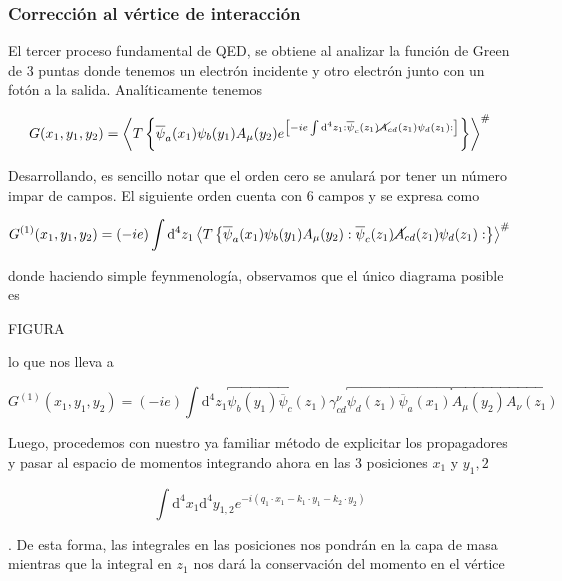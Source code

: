 \documentclass{article}
\numberwithin{equation}{section}
\begin{document}
\subsubsection{Corrección al vértice de interacción}

El tercer proceso fundamental de QED, se obtiene al analizar la función de Green de 3 puntas donde tenemos un electrón incidente y otro electrón junto con un fotón a la salida. Analíticamente tenemos

\begin{equation}\label{qedgreenvertex}
G(x_1,y_1,y_2)=\left\langle T\left\{ \overline{\psi}_a(x_1)\psi_b(y_1)A_{\mu}(y_2)e^{\left[-ie\int \mathrm{d^4}z_{1}:\overline{\psi}_c(z_{1})\cancel{A}_{cd}(z_{1})\psi_d(z_{1}):\right]}\right\} \right\rangle ^{\#}
\end{equation}

Desarrollando, es sencillo notar que el orden cero se anulará por tener un número impar de campos. El siguiente orden cuenta con 6 campos y se expresa como

\begin{equation}\label{key}
G^{(1)}(x_1,y_1,y_2)=(-ie)\int \mathrm{d^4}z_{1} \left\langle T\left\{ \overline{\psi}_a(x_1)\psi_b(y_1)A_{\mu}(y_2) :\overline{\psi}_c(z_{1})\cancel{A}_{cd}(z_{1})\psi_d(z_{1}):\right\} \right\rangle ^{\#}
\end{equation}

donde haciendo simple feynmenología, observamos que el único diagrama posible es

FIGURA

lo que nos lleva a

\begin{equation}\label{key}
G^{(1)}(x_1,y_1,y_2)=(-ie)\int \mathrm{d^4}z_{1} \overbracket{\psi_b(y_1)\overline{\psi}_c(z_{1})} \gamma^{\nu}_{cd} \overbracket{\psi_d(z_{1})\overline{\psi}_a(x_1)}  \overbracket{A_{\mu}(y_2) A_{\nu}(z_1)}
\end{equation}

Luego, procedemos con nuestro ya familiar método de explicitar los propagadores y pasar al espacio de momentos integrando ahora en las 3 posiciones $ x_1 $ y $ y_1,2 $

\begin{equation}\label{expfourier}
\int\mathrm{d^4}x_1\mathrm{d^4}y_{1,2} e^{-i\left(q_1 \cdot x_1 - k_1 \cdot y_1 - k_2 \cdot y_2\right)}
\end{equation}

. De esta forma, las integrales en las posiciones nos pondrán en la capa de masa mientras que la integral en $ z_1 $ nos dará la conservación del momento en el vértice
\end{document}
